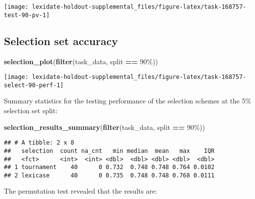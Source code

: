 \documentclass[
]{book}
\newenvironment{Shaded}{\begin{snugshade}}{\end{snugshade}}
\newcommand{\FunctionTok}[1]{\textcolor[rgb]{0.13,0.29,0.53}{\textbf{#1}}}
\newcommand{\NormalTok}[1]{#1}
\newcommand{\SpecialCharTok}[1]{\textcolor[rgb]{0.81,0.36,0.00}{\textbf{#1}}}
\newcommand{\StringTok}[1]{\textcolor[rgb]{0.31,0.60,0.02}{#1}}
\begin{document}
\texttt{[image: lexidate-holdout-supplemental\_files/figure-latex/task-168757-test-90-pv-1]}

\hypertarget{selection-set-accuracy-23}{%
\subsection{Selection set accuracy}\label{selection-set-accuracy-23}}

\begin{Shaded}
\begin{Highlighting}[]
\FunctionTok{selection\_plot}\NormalTok{(}\FunctionTok{filter}\NormalTok{(task\_data, split }\SpecialCharTok{==} \StringTok{\textquotesingle{}90\%\textquotesingle{}}\NormalTok{))}
\end{Highlighting}
\end{Shaded}

\texttt{[image: lexidate-holdout-supplemental\_files/figure-latex/task-168757-select-90-perf-1]}

Summary statistics for the testing performance of the selection schemes at the 5\% selection set split:

\begin{Shaded}
\begin{Highlighting}[]
\FunctionTok{selection\_results\_summary}\NormalTok{(}\FunctionTok{filter}\NormalTok{(task\_data, split }\SpecialCharTok{==} \StringTok{\textquotesingle{}90\%\textquotesingle{}}\NormalTok{))}
\end{Highlighting}
\end{Shaded}

\begin{verbatim}
## # A tibble: 2 x 8
##   selection  count na_cnt   min median  mean   max    IQR
##   <fct>      <int>  <int> <dbl>  <dbl> <dbl> <dbl>  <dbl>
## 1 tournament    40      0 0.732  0.748 0.748 0.764 0.0102
## 2 lexicase      40      0 0.735  0.748 0.748 0.768 0.0111
\end{verbatim}

The permutation test revealed that the results are:
\end{document}
